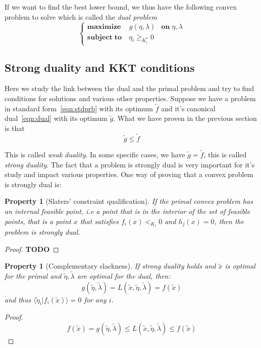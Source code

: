 \documentclass[10pt]{report}
\theoremstyle{plain}
\newtheorem{prop}[thm]{Property}
\theoremstyle{definition}
\theoremstyle{remark}
\newcommand{\TODO}{\textbf{TODO}}
\newcommand{\braket}[2]{\langle#1|#2\rangle}
\renewcommand{\geq}{\geqslant}
\renewcommand{\leq}{\leqslant}
\newcommand{\maxim}[3]{\begin{cases}
    \mathbf{maximize}\,\quad #1& \mathbf{on}\; #2\\
    \mathbf{subject\;to}\quad #3
  \end{cases}}
\begin{document}
If we want to find the best lower bound, we thus have the following convex
problem to solve which is called the \emph{dual problem}
\begin{equation}\label{eqn:dual}
\maxim{g(\eta,\lambda)}{\eta,\lambda}{\eta_i \geq_{K_i^*} 0}
\end{equation}

\subsection{Strong duality and KKT conditions}

Here we study the link between the dual and the primal problem and try to find
conditions for solutions and various other properties. Suppose we have a problem in
standard form~\ref{eqn:stdprb} with its optimum $\tilde f$ and it's canonical
dual~\ref{eqn:dual} with its optimum $\tilde g$. What we have proven in the
previous section is that
\[\tilde g \leq \tilde f\]

This is called \emph{weak duality}. In some specific cases, we have $\tilde g =
\tilde f$, this is called \emph{strong duality}. The fact that a problem is
strongly dual is very important for it's study and impact various properties.
One way of proving that a convex problem is strongly dual is:
\begin{prop}[Slaters' constraint qualification]\label{prop:slater}
  If the primal convex problem has an internal feasible point, i.e a point that is in
  the interior of the set of feasible points, that is a point $x$ that satisfies
  $f_i(x) <_{K_i} 0$ and $h_j(x) = 0$, then the problem is strongly dual.
\end{prop}

\begin{proof}
  \TODO{}
\end{proof}

\begin{prop}[Complementary slackness]
  If strong duality holds and $\tilde x$ is optimal for the primal and
  $\tilde \eta, \tilde{\lambda}$ are optimal for the dual, then:
  \[g(\tilde \eta, \tilde{\lambda}) = L(\tilde x, \tilde{\eta},\tilde{\lambda}) = f(\tilde{x})\]
  and thus $\braket {\tilde\eta_i}{f_i(\tilde{x})} = 0$ for any $i$.
\end{prop}

\begin{proof}
  \[ f(\tilde x) = g(\tilde \eta, \tilde{\lambda}) \leq
    L(\tilde x, \tilde{\eta},\tilde{\lambda}) \leq f(\tilde{x})\]
\end{proof}
\end{document}
